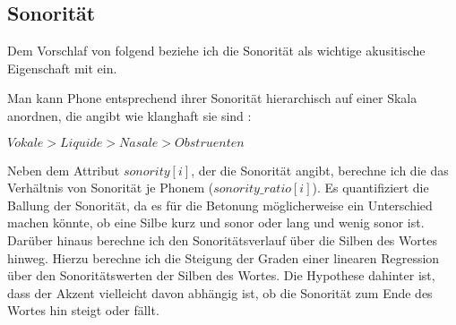 
\subsection{Sonorität}
Dem Vorschlaf von \cite{Wagner2001} folgend beziehe ich die Sonorität als wichtige akusitische Eigenschaft mit ein.


Man kann Phone entsprechend ihrer Sonorität hierarchisch auf einer Skala anordnen, die angibt wie klanghaft sie sind \cite[S.~230]{Hall2011}:

\begin{center}
$Vokale > Liquide > Nasale > Obstruenten$
\end{center}

Neben dem Attribut $sonority[i]$, der die Sonorität angibt, berechne ich die das Verhältnis von Sonorität je Phonem ($sonority\_ratio[i]$). Es quantifiziert die Ballung der Sonorität, da es für die Betonung möglicherweise ein Unterschied machen könnte, ob eine Silbe kurz und sonor oder lang und wenig sonor ist. Darüber hinaus berechne ich den Sonoritätsverlauf über die Silben des Wortes hinweg. Hierzu berechne ich die Steigung der Graden einer linearen Regression über den Sonoritätswerten der Silben des Wortes. Die Hypothese dahinter ist, dass der Akzent vielleicht davon abhängig ist, ob die Sonorität zum Ende des Wortes hin steigt oder fällt.


